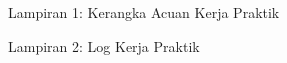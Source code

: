 \begin{center}
	Lampiran 1: Kerangka Acuan Kerja Praktik
\end{center}
\label{appendix:kakp}


\begin{center}
	Lampiran 2: Log Kerja Praktik
\end{center}
\label{appendix:logkp}

